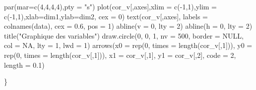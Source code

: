 \documentclass[
]{article}
\newenvironment{Shaded}{\begin{snugshade}}{\end{snugshade}}
\newcommand{\AttributeTok}[1]{\textcolor[rgb]{0.77,0.63,0.00}{#1}}
\newcommand{\ConstantTok}[1]{\textcolor[rgb]{0.00,0.00,0.00}{#1}}
\newcommand{\DecValTok}[1]{\textcolor[rgb]{0.00,0.00,0.81}{#1}}
\newcommand{\FloatTok}[1]{\textcolor[rgb]{0.00,0.00,0.81}{#1}}
\newcommand{\FunctionTok}[1]{\textcolor[rgb]{0.00,0.00,0.00}{#1}}
\newcommand{\NormalTok}[1]{#1}
\newcommand{\SpecialCharTok}[1]{\textcolor[rgb]{0.00,0.00,0.00}{#1}}
\newcommand{\StringTok}[1]{\textcolor[rgb]{0.31,0.60,0.02}{#1}}
\begin{document}
\begin{Shaded}
\begin{Highlighting}[]
  \FunctionTok{par}\NormalTok{(}\AttributeTok{mar=}\FunctionTok{c}\NormalTok{(}\DecValTok{4}\NormalTok{,}\DecValTok{4}\NormalTok{,}\DecValTok{4}\NormalTok{,}\DecValTok{4}\NormalTok{),}\AttributeTok{pty =} \StringTok{"s"}\NormalTok{)}
  \FunctionTok{plot}\NormalTok{(cor\_v[,axes],}\AttributeTok{xlim =} \FunctionTok{c}\NormalTok{(}\SpecialCharTok{{-}}\DecValTok{1}\NormalTok{,}\DecValTok{1}\NormalTok{),}\AttributeTok{ylim =} \FunctionTok{c}\NormalTok{(}\SpecialCharTok{{-}}\DecValTok{1}\NormalTok{,}\DecValTok{1}\NormalTok{),}\AttributeTok{xlab=}\NormalTok{dim1,}\AttributeTok{ylab=}\NormalTok{dim2, }\AttributeTok{cex =} \DecValTok{0}\NormalTok{)}
  \FunctionTok{text}\NormalTok{(cor\_v[,axes], }\AttributeTok{labels =} \FunctionTok{colnames}\NormalTok{(data), }\AttributeTok{cex =} \FloatTok{0.6}\NormalTok{, }\AttributeTok{pos =} \DecValTok{1}\NormalTok{)}
  \FunctionTok{abline}\NormalTok{(}\AttributeTok{v =} \DecValTok{0}\NormalTok{, }\AttributeTok{lty =} \DecValTok{2}\NormalTok{)}
  \FunctionTok{abline}\NormalTok{(}\AttributeTok{h =} \DecValTok{0}\NormalTok{, }\AttributeTok{lty =} \DecValTok{2}\NormalTok{)}
  \FunctionTok{title}\NormalTok{(}\StringTok{"Graphique des variables"}\NormalTok{)}
  \FunctionTok{draw.circle}\NormalTok{(}\DecValTok{0}\NormalTok{, }\DecValTok{0}\NormalTok{, }\DecValTok{1}\NormalTok{, }\AttributeTok{nv =} \DecValTok{500}\NormalTok{, }\AttributeTok{border =} \ConstantTok{NULL}\NormalTok{, }\AttributeTok{col =} \ConstantTok{NA}\NormalTok{, }\AttributeTok{lty =} \DecValTok{1}\NormalTok{, }\AttributeTok{lwd =} \DecValTok{1}\NormalTok{)}
  \FunctionTok{arrows}\NormalTok{(}\AttributeTok{x0 =} \FunctionTok{rep}\NormalTok{(}\DecValTok{0}\NormalTok{, }\AttributeTok{times =} \FunctionTok{length}\NormalTok{(cor\_v[,}\DecValTok{1}\NormalTok{])), }
         \AttributeTok{y0 =} \FunctionTok{rep}\NormalTok{(}\DecValTok{0}\NormalTok{, }\AttributeTok{times =} \FunctionTok{length}\NormalTok{(cor\_v[,}\DecValTok{1}\NormalTok{])), }
         \AttributeTok{x1 =}\NormalTok{ cor\_v[,}\DecValTok{1}\NormalTok{], }\AttributeTok{y1 =}\NormalTok{ cor\_v[,}\DecValTok{2}\NormalTok{], }
         \AttributeTok{code =} \DecValTok{2}\NormalTok{, }\AttributeTok{length =} \FloatTok{0.1}\NormalTok{)}

\NormalTok{\}}
\end{Highlighting}
\end{Shaded}
\end{document}
